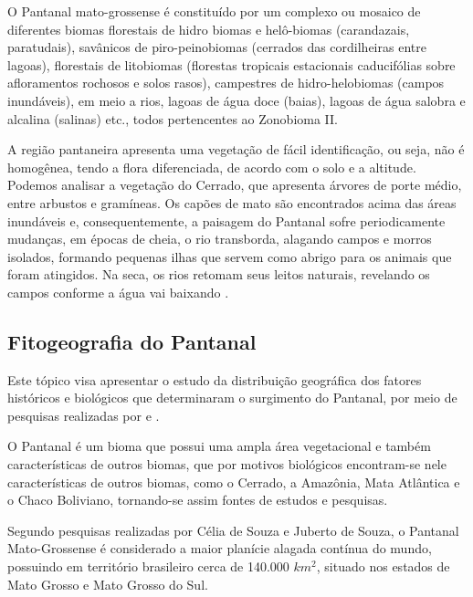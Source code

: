  		\begin{citacao}
 				O Pantanal mato-grossense é constituído por um complexo ou mosaico de diferentes biomas florestais de hidro biomas e helô-biomas (carandazais, paratudais), savânicos de piro-peinobiomas (cerrados das cordilheiras entre lagoas), florestais de litobiomas (florestas tropicais estacionais caducifólias sobre afloramentos rochosos e solos rasos), campestres de hidro-helobiomas (campos inundáveis), em meio a rios, lagoas de água doce (baias), lagoas de água salobra e alcalina (salinas) etc., todos pertencentes ao Zonobioma II.\cite{coutinho2006conceito} 
 		\end{citacao}
 	
		
		A região pantaneira apresenta uma vegetação de fácil identificação, ou seja, não é homogênea, tendo a flora diferenciada, de acordo com o solo e a altitude. Podemos analisar a vegetação do Cerrado, que apresenta árvores de porte médio, entre arbustos e gramíneas. Os capões de mato são encontrados acima das áreas inundáveis e, consequentemente, a paisagem do Pantanal sofre periodicamente mudanças, em épocas de cheia, o rio transborda, alagando campos e morros isolados, formando pequenas ilhas que servem como abrigo para os animais que foram atingidos. Na seca, os rios retomam seus leitos naturais,  revelando os campos conforme a água vai baixando \cite{eco}.
					
	
	\subsection{Fitogeografia do Pantanal} 
	
		Este tópico visa apresentar o estudo da distribuição geográfica dos fatores históricos e biológicos que determinaram o surgimento do Pantanal, por meio de pesquisas realizadas por  e .
		
		O Pantanal é um bioma que possui uma ampla área vegetacional e também características de outros biomas, que por motivos biológicos encontram-se nele características de outros biomas, como o Cerrado, a Amazônia, Mata Atlântica e o Chaco Boliviano, tornando-se assim fontes de estudos e pesquisas.
		
		Segundo pesquisas realizadas por Célia de Souza e Juberto de Souza, o Pantanal Mato-Grossense é considerado a maior planície alagada contínua do mundo, possuindo em território brasileiro cerca de 140.000 $km^{2}$,  situado nos estados de Mato Grosso e Mato Grosso do Sul.
		
